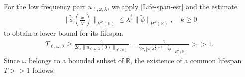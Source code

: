 \documentclass[12pt,reqno]{amsart}
\newcommand{\rr}{\mathbb{R}}
\theoremstyle{plain}  %
\theoremstyle{definition}
\begin{document}
%
%
For the low frequency part $u_{\ell, \omega, \lambda}$, we apply \eqref{Life-span-est} and the estimate
%
%
\begin{equation}
\begin{split}
	\label{tildphi}
\|\tilde{\phi}\left( \frac{x}{\lambda^\delta}
\right)\|_{H^{k}(\rr)} \le
\lambda^{\frac{\delta}{2}}\|\tilde{\phi}\|_{H^{k}(\rr)},
\quad k\ge 0
\end{split}
\end{equation}
%
%
to obtain a lower bound for its lifespan
%
\begin{equation*}
	\label{lifespan-bound-1}
	\begin{split}
		T_{\ell, \omega,\lambda} \ge \frac{1}{2 c_s \|u_{\ell, \omega, \lambda}(0)\|_{H^s(\rr)}} = 
		\frac{1}{2 c_s |\omega|
		\lambda^{\frac{\delta}{2}-1}\|\tilde{\phi}\|_{H^s(\rr)}} >> 1.
	\end{split}
\end{equation*}
%
%
Since $\omega$ belongs to a bounded subset of $\rr$, the existence of a 
common lifespan $T >> 1$ follows. 
%
%
\end{document}
